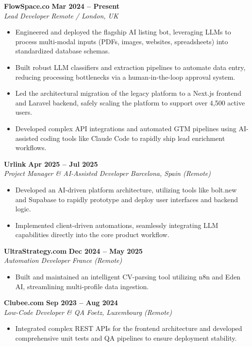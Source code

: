 \documentclass[11pt,a4paper]{article}
\begin{document}
\textbf{FlowSpace.co} \hfill \textbf{Mar 2024 -- Present} \\
\textit{Lead Developer} \hfill \textit{Remote / London, UK}
\begin{itemize}[leftmargin=*, parsep=0pt, itemsep=2pt]
    \item Engineered and deployed the flagship AI listing bot, leveraging LLMs to process multi-modal inputs (PDFs, images, websites, spreadsheets) into standardized database schemas.
    \item Built robust LLM classifiers and extraction pipelines to automate data entry, reducing processing bottlenecks via a human-in-the-loop approval system.
    \item Led the architectural migration of the legacy platform to a Next.js frontend and Laravel backend, safely scaling the platform to support over 4,500 active users.
    \item Developed complex API integrations and automated GTM pipelines using AI-assisted coding tools like Claude Code to rapidly ship lead enrichment workflows.
\end{itemize}

\textbf{Urlink} \hfill \textbf{Apr 2025 -- Jul 2025} \\
\textit{Project Manager \& AI-Assisted Developer} \hfill \textit{Barcelona, Spain (Remote)}
\begin{itemize}[leftmargin=*, parsep=0pt, itemsep=2pt]
    \item Developed an AI-driven platform architecture, utilizing tools like bolt.new and Supabase to rapidly prototype and deploy user interfaces and backend logic.
    \item Implemented client-driven automations, seamlessly integrating LLM capabilities directly into the core product workflow.
\end{itemize}

\textbf{UltraStrategy.com} \hfill \textbf{Dec 2024 -- May 2025} \\
\textit{Automation Developer} \hfill \textit{France (Remote)}
\begin{itemize}[leftmargin=*, parsep=0pt, itemsep=2pt]
    \item Built and maintained an intelligent CV-parsing tool utilizing n8n and Eden AI, streamlining multi-profile data ingestion.
\end{itemize}

\textbf{Clubee.com} \hfill \textbf{Sep 2023 -- Aug 2024} \\
\textit{Low-Code Developer \& QA} \hfill \textit{Foetz, Luxembourg (Remote)}
\begin{itemize}[leftmargin=*, parsep=0pt, itemsep=2pt]
    \item Integrated complex REST APIs for the frontend architecture and developed comprehensive unit tests and QA pipelines to ensure deployment stability.
\end{itemize}
\end{document}
